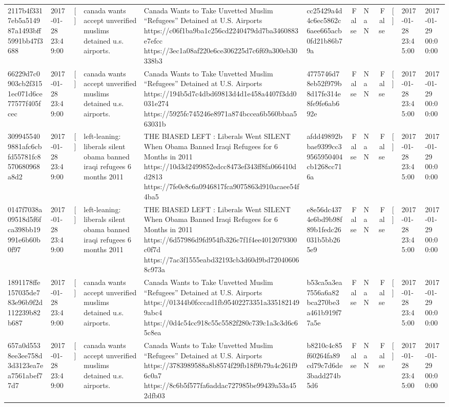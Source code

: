 \begin{tabular}{llllllrlrlll}
2117b4f3317eb5a514987a1493bff5991bb47f3688 & 2017-01-28 23:49:00 & [] & canada wants accept unverified muslims detained u.s. airports. & Canada Wants to Take Unvetted Muslim “Refugees” Detained at U.S. Airports https://c06f1ba9ba1c256cd2240479dd7ba3460883e7efcc https://3ec1a08af220e6ce306225d7c6f69a300eb30338b3 & cc25429a4d4c6ec5862c6aee665acb0fd21b86b79a & False & NaN & False & [] & 2017-01-28 23:45:00 & 2017-01-29 00:00:00 \\
66229d7c0903cb2f3151ec071d6ce77577f405fcec & 2017-01-28 23:49:00 & [] & canada wants accept unverified muslims detained u.s. airports. & Canada Wants to Take Unvetted Muslim “Refugees” Detained at U.S. Airports https://194b5d7c4dbd69813d4d1e458a4407f3dd0031e274 https://5925fc745246e8971a874bccea6b560bbaa563031b & 4775746d78eb52f979b8d17fe314e8fe9fe6ab692e & False & NaN & False & [] & 2017-01-28 23:45:00 & 2017-01-29 00:00:00 \\
3099455409881afc6cbfd55781fc8570680968a8d2 & 2017-01-28 23:49:00 & [] & left-leaning: liberals silent obama banned iraqi refugees 6 months 2011 & THE BIASED LEFT : Liberals Went SILENT When Obama Banned Iraqi Refugees for 6 Months in 2011 https://10d3d2499852edcc8473ef343ff8fa066410dd2813 https://7fe0e8c6a0946817fca9075863d910acaee54f4ba5 & afdd49892bbae9399cc39565950404cb1268cc716a & False & NaN & False & [] & 2017-01-28 23:45:00 & 2017-01-29 00:00:00 \\
0147f7038a09518d5f6fca398bb19991e6b60b0f97 & 2017-01-28 23:49:00 & [] & left-leaning: liberals silent obama banned iraqi refugees 6 months 2011 & THE BIASED LEFT : Liberals Went SILENT When Obama Banned Iraqi Refugees for 6 Months in 2011 https://6d57986d9fd954fb326c7f1f4ee4012079300c0f7d https://7ac3f1555eabd32193cb3d60d9bd720406068c973a & e8e56dc4374e6bd9b98f89b1fedc26031b5bb265e9 & False & NaN & False & [] & 2017-01-28 23:45:00 & 2017-01-29 00:00:00 \\
1891178ffe157035de783e96b9f2d112239b82b687 & 2017-01-28 23:49:00 & [] & canada wants accept unverified muslims detained u.s. airports. & Canada Wants to Take Unvetted Muslim “Refugees” Detained at U.S. Airports https://01344b0fcccad1fb95402273351a3351821499abc4 https://0d4c54cc918c55c5582f280c739c1a3c3d6c65c8ea & b53ca5a3ea7556a6a82bca270be3a461b919f77a5e & False & NaN & False & [] & 2017-01-28 23:45:00 & 2017-01-29 00:00:00 \\
657a0d5538ee3ee758d3d3123ea7ea7561abef77d7 & 2017-01-28 23:49:00 & [] & canada wants accept unverified muslims detained u.s. airports. & Canada Wants to Take Unvetted Muslim “Refugees” Detained at U.S. Airports https://3783989588a8b8574f29fb18f9b79a4c261f96c0a7 https://8c6b5f577fa6addac727985be99439a53a452dfb03 & b8210c4c85f60264fa89cd79c7d6de3badd274b5d6 & False & NaN & False & [] & 2017-01-28 23:45:00 & 2017-01-29 00:00:00 \\

\end{tabular}
